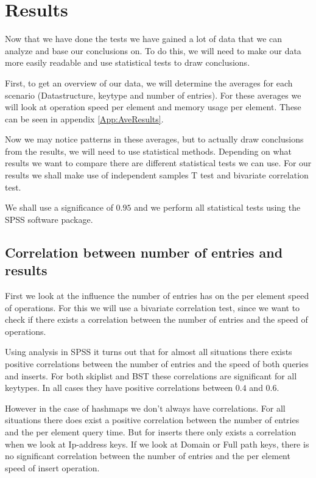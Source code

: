 \documentclass[12pt,a4paper]{article}
\begin{document}
    \section{Results}

    Now that we have done the tests we have gained a lot of data that we can analyze and base our 
    conclusions on. To do this, we will need to make our data more easily readable and use statistical
    tests to draw conclusions.

     First, to get an overview of our data, we will determine the averages for each scenario
    (Datastructure, keytype and number of entries). For these averages we will look at operation speed per
    element and memory usage per element. These can be seen in appendix \ref{App:AveResults}.

    Now we may notice patterns in these averages, but to actually draw conclusions from the results, we will
    need to use statistical methods. Depending on what results we want to compare there are different statistical
    tests we can use. For our results we shall make use of independent samples T test and bivariate correlation test.

    We shall use a significance of $0.95$ and we perform all statistical tests using the SPSS software package.

    \subsection{Correlation between number of entries and results}
    First we look at the influence the number of entries has on the per element speed of operations. For this
    we will use a bivariate correlation test, since we want to check if there exists a correlation between 
    the number of entries and the speed of operations.

    Using analysis in SPSS it turns out that for almost all situations there exists positive correlations between the number
    of entries and the speed of both queries and inserts. For both skiplist and BST these correlations are significant for all
    keytypes. In all cases they have positive correlations between $0.4$ and $0.6$. 

    However in the case of hashmaps we don't always have correlations. For all situations there does exist a positive correlation
    between the number of entries and the per element query time. But for inserts there only exists a correlation when we 
    look at Ip-address keys. If we look at Domain or Full path keys, there is no significant correlation between the number of entries
    and the per element speed of insert operation. 
\end{document}
